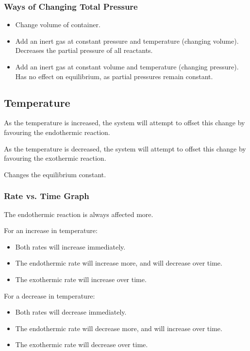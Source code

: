 \documentclass[a4paper,11pt]{article}
\begin{document}
\subsubsection{Ways of Changing Total Pressure}

\begin{itemize}
\item Change volume of container.
\item Add an inert gas at constant pressure and temperature (changing volume).
	Decreases the partial pressure of all reactants.
\item Add an inert gas at constant volume and temperature (changing pressure).
	Has no effect on equilibrium, as partial pressures remain constant.
\end{itemize}


\subsection{Temperature}

As the temperature is increased, the system will attempt to offset this change
by favouring the endothermic reaction.

As the temperature is decreased, the system will attempt to offset this change
by favouring the exothermic reaction.

Changes the equilibrium constant.


\subsubsection{Rate vs. Time Graph}

The endothermic reaction is always affected more.

For an increase in temperature:

\begin{itemize}
\item Both rates will increase immediately.
\item The endothermic rate will increase more, and will decrease over time.
\item The exothermic rate will increase over time.
\end{itemize}

For a decrease in temperature:

\begin{itemize}
\item Both rates will decrease immediately.
\item The endothermic rate will decrease more, and will increase over time.
\item The exothermic rate will decrease over time.
\end{itemize}
\end{document}
